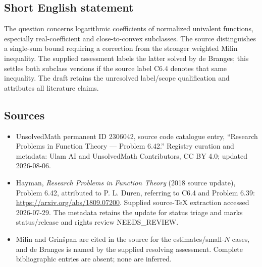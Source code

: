 \documentclass[11pt]{article}
\begin{document}
\subsection{Short English statement}
The question concerns logarithmic coefficients of normalized univalent functions, especially real-coefficient and close-to-convex subclasses. The source distinguishes a single-sum bound requiring a correction from the stronger weighted Milin inequality. The supplied assessment labels the latter solved by de Branges; this settles both subclass versions if the source label C6.4 denotes that same inequality. The draft retains the unresolved label/scope qualification and attributes all literature claims.
\subsection{Sources}
\begin{itemize}
\item UnsolvedMath permanent ID 2306042, source code catalogue entry, ``Research Problems in Function Theory --- Problem 6.42.'' Registry curation and metadata: Ulam AI and UnsolvedMath Contributors, CC BY 4.0; updated 2026-08-06.
\item Hayman, \emph{Research Problems in Function Theory} (2018 source update), Problem 6.42, attributed to P. L. Duren, referring to C6.4 and Problem 6.39: \url{https://arxiv.org/abs/1809.07200}. Supplied source-TeX extraction accessed 2026-07-29. The metadata retains the update for status triage and marks status/release and rights review NEEDS\_REVIEW.
\item Milin and Grinšpan are cited in the source for the estimates/small-$N$ cases, and de Branges is named by the supplied resolving assessment. Complete bibliographic entries are absent; none are inferred.
\end{itemize}
\end{document}
